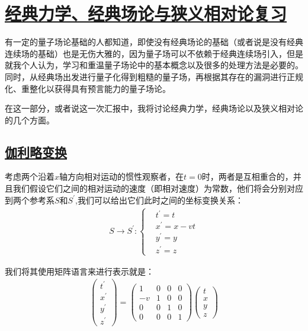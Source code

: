 \chapter{\protect\hyperlink{:}{经典力学、经典场论与狭义相对论复习}}
有一定的量子场论基础的人都知道，即使没有经典场论的基础（或者说是没有经典连续场的基础）也是无伤大雅的，因为量子场可以不依赖于经典连续场引入，但是就我个人认为，学习和重温量子场论中的基本概念以及很多的处理方法是必要的。同时，从经典场出发进行量子化得到粗糙的量子场，再根据其存在的漏洞进行正规化、重整化以获得具有预言能力的量子场论。

在这一部分，或者说这一次汇报中，我将讨论经典力学，经典场论以及狭义相对论的几个方面。


\section{\protect\hyperlink{:}{伽利略变换}}
考虑两个沿着$x$轴方向相对运动的惯性观察者，在$t=0$时，两者是互相重合的，并且我们假设它们之间的相对运动的速度（即相对速度）为常数，他们将会分别对应到两个参考系$S$和$S^\prime$,我们可以给出它们此时之间的坐标变换关系：
\begin{align*}
    S\to S^\prime:
    \begin{cases}
        &t^\prime=t\\
        &x^\prime=x-vt\\
        &y^\prime=y\\
        &z^\prime=z
    \end{cases}
\end{align*}

我们将其使用矩阵语言来进行表示就是：
\begin{align*}
    \begin{pmatrix}
        t^\prime\\x^\prime\\y^\prime\\z^\prime
    \end{pmatrix}
    =
    \begin{pmatrix}
        1&0&0&0\\
        -v&1&0&0\\
        0&0&1&0\\
        0&0&0&1
    \end{pmatrix}
    \begin{pmatrix}
        t\\x\\y\\z
    \end{pmatrix}
\end{align*}

